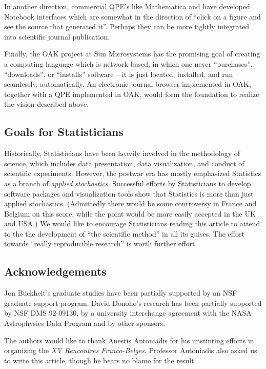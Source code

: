 In another direction, commercial QPE's like Mathematica
and \Matlab have developed Notebook interfaces which are somewhat
in the direction of ``click on a figure and see the source that
generated it''. Perhaps they can be more tightly integrated into
scientific journal publication.

Finally, the OAK project at Sun Microsystems has the promising
goal of creating a computing language which is network-based,
in which one never ``purchases'', ``downloads'', or ``installs''
software -- it is just located, installed, and run seamlessly,
automatically.  An electronic journal browser implemented
in OAK, together with a QPE implemented in OAK, would form the foundation to
realize the vision described above.

\subsection{Goals for Statisticians}

Historically, Statisticians have been heavily involved in the methodology
of science, which includes data presentation,
data visualization, and conduct of scientific
experiments.  However, the postwar era has mostly emphasized
Statistics as a branch of {\it applied stochastics}.  Successful
efforts by Statisticians to develop software packages and
visualization tools show that Statistics is more than
just applied stochastics. (Admittedly there would
be some controversy in France and Belgium on this
score, while the point would be more easily accepted
in the UK and USA.)  We would like to encourage Statisticians
reading this article to attend to the
the development of ``the scientific method'' in all its guises.
The effort towards ``really reproducible research'' is worth further effort.

\subsection{Acknowledgements}

Jon Buckheit's graduate studies
have been partially supported by an NSF graduate support program.
David Donoho's research has been partially supported by
NSF DMS 92-09130, by a university interchange agreement
with the NASA Astrophysics Data Program and by other sponsors.

The authors would like to thank Anestis Antoniadis
for his unstinting efforts in organizing the {\it XV Rencontres
Franco-Belges}.
Professor Antoniadis also asked us to write this article,
though he bears no blame for the result.

